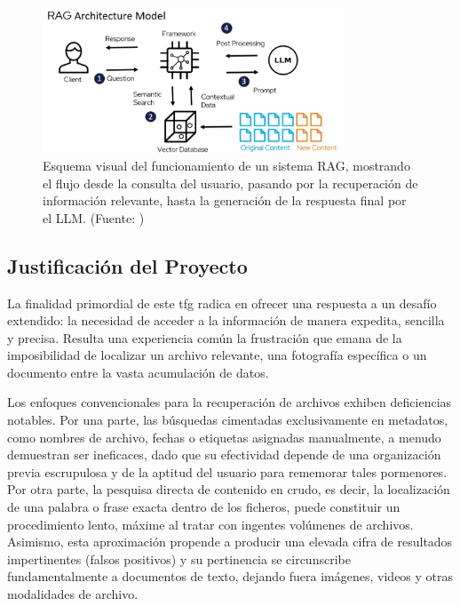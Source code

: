 \bigskip %
\begin{figure}[H] %
    \centering %
    \includegraphics[width=0.8\textwidth]{archivos/RAG_scheme.png} %
    \caption[Esquema de un sistema RAG]{Esquema visual del funcionamiento de un sistema RAG, mostrando el flujo desde la consulta del usuario, pasando por la recuperación de información relevante, hasta la generación de la respuesta final por el LLM. (Fuente: \citep{noauthor_advanced_nodate})} %
    \label{fig:rag_scheme} %
\end{figure}
\bigskip %

\subsection{Justificación del Proyecto}
La finalidad primordial de este \gls{tfg} radica en ofrecer una respuesta a un desafío extendido: la necesidad de acceder a la información de manera expedita, sencilla y precisa. Resulta una experiencia común la frustración que emana de la imposibilidad de localizar un archivo relevante, una fotografía específica o un documento entre la vasta acumulación de datos.

Los enfoques convencionales para la recuperación de archivos exhiben deficiencias notables. Por una parte, las búsquedas cimentadas exclusivamente en metadatos, como nombres de archivo, fechas o etiquetas asignadas manualmente, a menudo demuestran ser ineficaces, dado que su efectividad depende de una organización previa escrupulosa y de la aptitud del usuario para rememorar tales pormenores. Por otra parte, la pesquisa directa de contenido en crudo, es decir, la localización de una palabra o frase exacta dentro de los ficheros, puede constituir un procedimiento lento, máxime al tratar con ingentes volúmenes de archivos. Asimismo, esta aproximación propende a producir una elevada cifra de resultados impertinentes (falsos positivos) y su pertinencia se circunscribe fundamentalmente a documentos de texto, dejando fuera imágenes, videos y otras modalidades de archivo.

